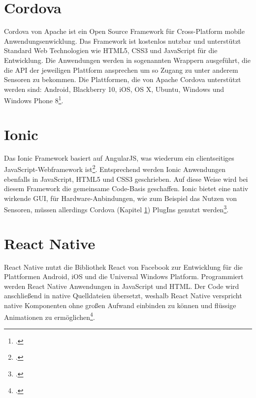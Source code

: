 \section{Cordova} \label{chpCordova}

Cordova von Apache ist ein Open Source Framework für Cross-Platform mobile Anwendungsenwicklung. Das Framework ist kostenlos nutzbar und unterstützt Standard Web Technologien wie HTML5, CSS3 und JavaScript für die Entwicklung. Die Anwendungen werden in sogenannten Wrappern ausgeführt, die die API der jeweiligen Plattform ansprechen um so Zugang zu unter anderem Sensoren zu bekommen. Die Plattformen, die von Apache Cordova unterstützt werden sind: Android, Blackberry 10, iOS, OS X, Ubuntu, Windows und Windows Phone 8\footcite{Cordova}. 

\section{Ionic}

Das Ionic Framework basiert auf AngularJS, was wiederum ein clientseitiges JavaScript-Webframework ist\footcite{AngularJS}. Entsprechend werden Ionic Anwendungen ebenfalls in JavaScript, HTML5 und CSS3 geschrieben. Auf diese Weise wird bei diesem Framework die gemeinsame Code-Basis geschaffen. Ionic bietet eine nativ wirkende GUI, für Hardware-Anbindungen, wie zum Beispiel das Nutzen von Sensoren, müssen allerdings Cordova (Kapitel  \ref{chpCordova}) PlugIns genutzt werden\footcite{Ionic}. 

\section{React Native}

React Native nutzt die Bibliothek React von Facebook zur Entwicklung für die Plattformen Android, iOS und die Universal Windows Platform. Programmiert werden React Native Anwendungen in JavaScript und HTML. Der Code wird anschließend in native Quelldateien übersetzt, weshalb React Native verspricht native Komponenten ohne großen Aufwand einbinden zu können und flüssige Animationen zu ermöglichen\footcite{EinerFuerAlles}.